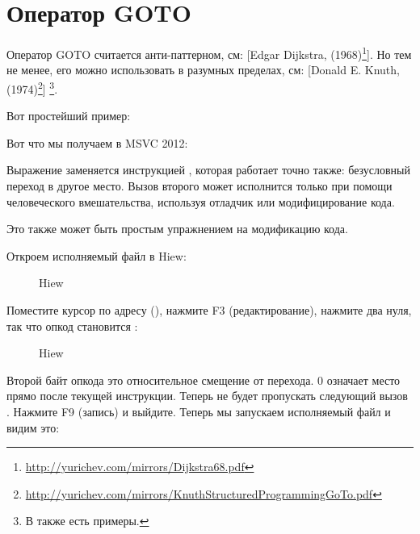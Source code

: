 \section{Оператор GOTO}

Оператор GOTO считается анти-паттерном, см:
[Edgar Dijkstra,  (1968)\footnote{\url{http://yurichev.com/mirrors/Dijkstra68.pdf}}].
Но тем не менее, его можно использовать в разумных пределах, см:
[Donald E. Knuth,  (1974)\footnote{\url{http://yurichev.com/mirrors/KnuthStructuredProgrammingGoTo.pdf}}]
\footnote{В \InSqBrackets{\CNotes} также есть примеры.}.

Вот простейший пример:



Вот что мы получаем в MSVC 2012:



Выражение  заменяется инструкцией \JMP, которая работает точно также: безусловный переход в другое место.
Вызов второго \printf может исполнится только при помощи человеческого вмешательства, используя отладчик или модифицирование кода.

\par

\clearpage
Это также может быть простым упражнением на модификацию кода.

Откроем исполняемый файл в Hiew:

\begin{figure}[H]
\centering
{}
\caption{Hiew}
\label{fig:goto_hiew1}
\end{figure}

\clearpage
Поместите курсор по адресу \JMP (), 
нажмите F3 (редактирование), нажмите два нуля, так что
опкод становится :

\begin{figure}[H]
\centering
{}
\caption{Hiew}
\label{fig:goto_hiew2}
\end{figure}

Второй байт опкода \JMP это относительное смещение от перехода. 0 означает место
прямо после текущей инструкции.
Теперь \JMP не будет пропускать следующий вызов \printf.
Нажмите F9 (запись) и выйдите.
Теперь мы запускаем исполняемый файл и видим это:



